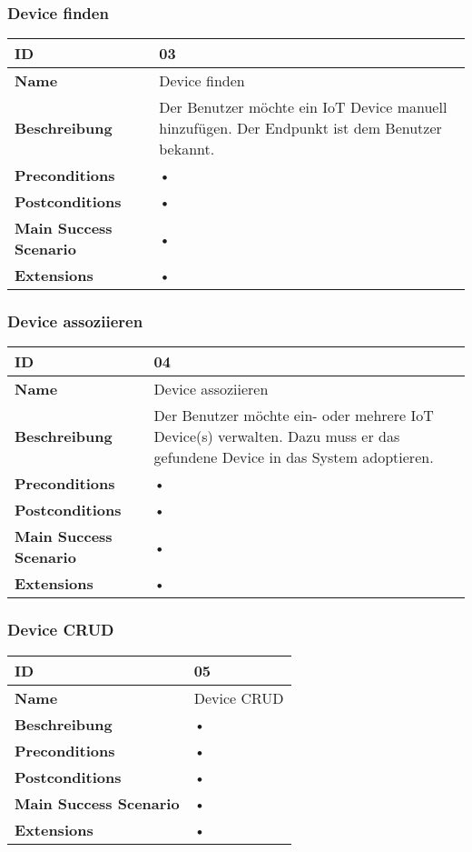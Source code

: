 \subsubsection{Device finden}
\mbox{}
\begin{longtable}{| p{4cm} | p{11.7cm} |}
 \hline
 \textbf{ID} & 03\\ \hline 
 \textbf{Name} & Device finden\\ \hline 
 \textbf{Beschreibung} & Der Benutzer möchte ein IoT Device manuell hinzufügen. Der Endpunkt ist dem Benutzer bekannt. \\ \hline 
 \textbf{Preconditions} & • \\ \hline 
 \textbf{Postconditions} & • \\ \hline 
 \textbf{Main Success Scenario} & • \\ \hline 
 \textbf{Extensions} & • \\ \hline 
 \end{longtable}
 
\subsubsection{Device assoziieren}
\mbox{}
\begin{longtable}{| p{4cm} | p{11.7cm} |}
 \hline
 \textbf{ID} & 04\\ \hline 
 \textbf{Name} & Device assoziieren \\ \hline 
 \textbf{Beschreibung} & Der Benutzer möchte ein- oder mehrere IoT Device(s) verwalten. Dazu muss er das gefundene Device in das System adoptieren. \\ \hline 
 \textbf{Preconditions} & • \\ \hline 
 \textbf{Postconditions} & • \\ \hline 
 \textbf{Main Success Scenario} & • \\ \hline 
 \textbf{Extensions} & • \\ \hline 
 \end{longtable}
 
\subsubsection{Device CRUD}
\mbox{}
\begin{longtable}{| p{4cm} | p{11.7cm} |}
 \hline
 \textbf{ID} & 05\\ \hline 
 \textbf{Name} & Device CRUD\\ \hline 
 \textbf{Beschreibung} & • \\ \hline 
 \textbf{Preconditions} & • \\ \hline 
 \textbf{Postconditions} & • \\ \hline 
 \textbf{Main Success Scenario} & • \\ \hline 
 \textbf{Extensions} & • \\ \hline 
 \end{longtable}
 
